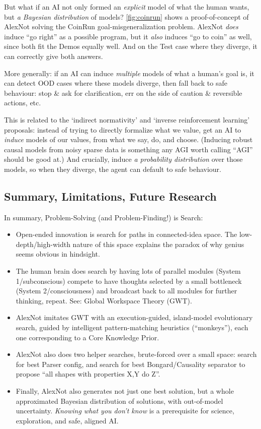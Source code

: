 \documentclass[11pt]{article}
\begin{document}
But what if an AI not only formed an \textit{explicit} model of what the human wants, but \textit{a Bayesian distribution} of models? \autoref{fig:coinrun} shows a proof-of-concept of AlexNot solving the CoinRun goal-misgeneralization problem. AlexNot \textit{does} induce ``go right'' as a possible program, but it \textit{also} induces ``go to coin'' as well, since both fit the Demos equally well. And on the Test case where they diverge, it can correctly give both answers.

More generally: if an AI can induce \textit{multiple} models of what a human's goal is, it can detect OOD cases where these models diverge, then fall back to safe behaviour: stop \& ask for clarification, err on the side of caution \& reversible actions, etc.

This is related to the `indirect normativity' \citep{superintelligence,christiano_indirect_normativity} and `inverse reinforcement learning' \citep{russell_irl,inverse_rl} proposals: instead of trying to directly formalize what we value, get an AI to \textit{induce} models of our values, from what we say, do, and choose. (Inducing robust causal models from noisy sparse data is something any AGI worth calling ``AGI'' should be good at.) And crucially, induce \textit{a probability distribution} over those models, so when they diverge, the agent can default to safe behaviour.

\subsection{Summary, Limitations, Future Research}

In summary, Problem-Solving (and Problem-Finding!) is Search:

\begin{itemize}
    \item Open-ended innovation is search for paths in connected-idea space. The low-depth/high-width nature of this space explains the paradox of why genius seems obvious in hindsight.
    \item The human brain does search by having lots of parallel modules (System 1/subconscious) compete to have thoughts selected by a small bottleneck (System 2/consciousness) and broadcast back to all modules for further thinking, repeat. See: Global Workspace Theory (GWT).
    \item AlexNot imitates GWT with an execution-guided, island-model evolutionary search, guided by intelligent pattern-matching heuristics (``monkeys''), each one corresponding to a Core Knowledge Prior.
    \item AlexNot also does two helper searches, brute-forced over a small space: search for best Parser config, and search for best Bongard/Causality separator to propose ``all shapes with properties X,Y do Z''.
    \item Finally, AlexNot also generates not just one best solution, but a whole approximated Bayesian distribution of solutions, with out-of-model uncertainty. \textit{Knowing what you don't know} is a prerequisite for science, exploration, and safe, aligned AI.
\end{itemize}
\end{document}
